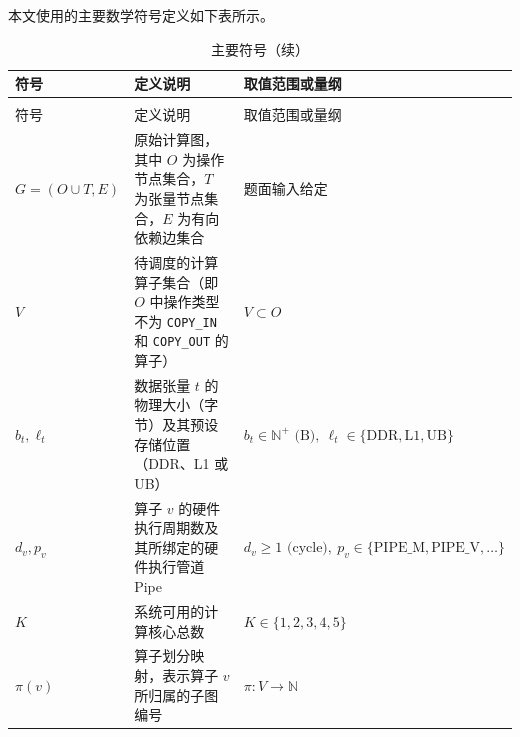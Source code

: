 \documentclass[anonymous,notoc]{gmcm2026}
\begin{document}
本文使用的主要数学符号定义如下表所示。

{\def\LTcaptype{table} %
\begin{longtable}[]{@{}
  >{\raggedright\arraybackslash}p{}
  >{\raggedright\arraybackslash}p{}
  >{\raggedright\arraybackslash}p{}@{}}
\caption{主要符号}\label{tab:02-assumptions-1}\\
\toprule\noalign{}
\begin{minipage}[b]{\linewidth}\raggedright
符号
\end{minipage} & \begin{minipage}[b]{\linewidth}\raggedright
定义说明
\end{minipage} & \begin{minipage}[b]{\linewidth}\raggedright
取值范围或量纲
\end{minipage} \\
\midrule\noalign{}
\endfirsthead
\caption[]{主要符号（续）}\\
\toprule\noalign{}
\begin{minipage}[b]{\linewidth}\raggedright
符号
\end{minipage} & \begin{minipage}[b]{\linewidth}\raggedright
定义说明
\end{minipage} & \begin{minipage}[b]{\linewidth}\raggedright
取值范围或量纲
\end{minipage} \\
\midrule\noalign{}
\endhead
\bottomrule\noalign{}
\endlastfoot
\(G=(O\cup T, E)\) & 原始计算图，其中 \(O\) 为操作节点集合，\(T\) 为张量节点集合，\(E\) 为有向依赖边集合 & 题面输入给定 \\
\(V\) & 待调度的计算算子集合（即 \(O\) 中操作类型不为 \texttt{COPY\_IN} 和 \texttt{COPY\_OUT} 的算子） & \(V \subset O\) \\
\(b_t, \ell_t\) & 数据张量 \(t\) 的物理大小（字节）及其预设存储位置（DDR、L1 或 UB） & \(b_t \in \mathbb{N}^+ \text{ (B)},\ \ell_t \in \{\text{DDR}, \text{L1}, \text{UB}\}\) \\
\(d_v, p_v\) & 算子 \(v\) 的硬件执行周期数及其所绑定的硬件执行管道 Pipe & \(d_v \ge 1 \text{ (cycle)},\ p_v \in \{\text{PIPE\_M}, \text{PIPE\_V}, \dots\}\) \\
\(K\) & 系统可用的计算核心总数 & \(K \in \{1, 2, 3, 4, 5\}\) \\
\(\pi(v)\) & 算子划分映射，表示算子 \(v\) 所归属的子图编号 & \(\pi: V \to \mathbb{N}\) \\

\end{longtable}}
\end{document}

